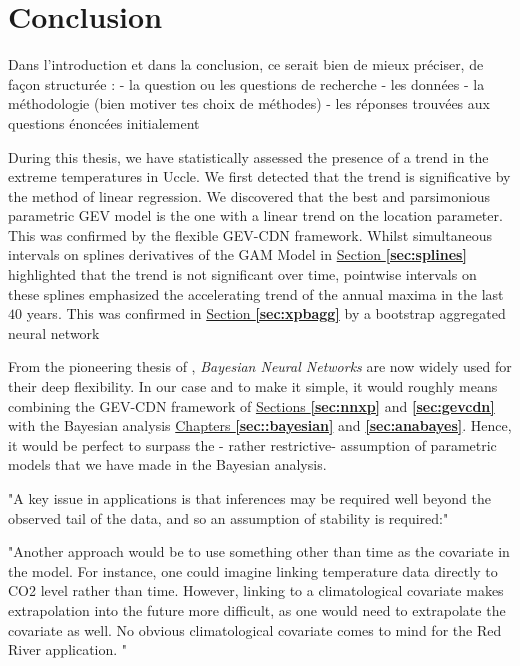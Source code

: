 \documentclass[11pt,a4paper,openany, twosided]{book}
\begin{document}
\newpage





\chapter*{Conclusion}
\thispagestyle{empty}

Dans l'introduction et dans la conclusion, ce serait bien de mieux préciser, de façon structurée :
- la question ou les questions de recherche
- les données
- la méthodologie (bien motiver tes choix de méthodes)
- les réponses trouvées aux questions énoncées initialement


During this thesis, we have statistically assessed the presence of a trend in the extreme temperatures in Uccle. We first detected that the trend is significative by the method of linear regression. We discovered that the best and parsimonious parametric GEV model is the one with a linear trend on the location parameter. This was confirmed by the flexible GEV-CDN framework. Whilst simultaneous intervals on splines derivatives of the GAM Model in \hyperref[sec:splines]{Section \textbf{\ref{sec:splines}}} highlighted that the trend is not significant over time, pointwise intervals on these splines emphasized the accelerating trend of the annual maxima in the last $40$ years. This was confirmed in \hyperref[sec:xpbagg]{Section \textbf{\ref{sec:xpbagg}}} by a bootstrap aggregated neural network 

From the pioneering thesis of \citet{Neal_1996_bay}, \emph{Bayesian Neural Networks} are now widely used for their deep flexibility. In our case and to make it simple, it would roughly means combining the GEV-CDN framework of \hyperref[sec:nnxp]{Sections \textbf{\ref{sec:nnxp}}} and \hyperref[sec:gevcdn]{ \textbf{\ref{sec:gevcdn}}} with the Bayesian analysis \hyperref[sec::bayesian]{ Chapters \textbf{\ref{sec::bayesian}}} and \textbf{\ref{sec:anabayes}}. Hence, it would be perfect to surpass the - rather restrictive- assumption of parametric models that we have made in the Bayesian analysis.

"A key issue in applications is that inferences
may be required well beyond the observed tail of
the data, and so an assumption of stability is required:" \cite{davison_statistical_2012}

"Another approach would be to use something other than time as the covariate 
in the model. For instance, one could imagine linking temperature data directly to
CO2 level rather than time. However, linking to a climatological covariate makes
extrapolation into the future more difficult, as one would need to extrapolate the 
covariate as well. No obvious climatological covariate comes to mind for the Red
River application. " %
\end{document}
